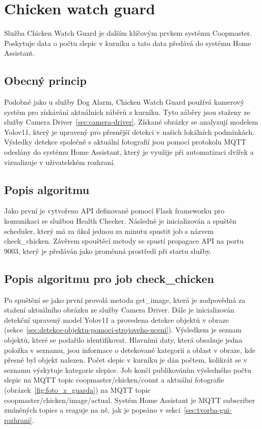 \section{Chicken watch guard}\label{sec:chicken-watch-guard}
Služba Chicken Watch Guard je dalším klíčovým prvkem systému Coopmaster.
Poskytuje data o počtu slepic v kurníku a tato data předává do systému Home Assistant.\newline

\subsection*{Obecný princip}
Podobně jako u služby Dog Alarm, Chicken Watch Guard používá kamerový systém pro získávání aktuálních záběrů z kurníku.
Tyto záběry jsou staženy ze služby Camera Driver~\ref{sec:camera-driver}.
Získané obrázky se analyzují modelem Yolov11, který je upravený pro přesnější detekci v našich lokálních podmínkách.
Výsledky detekce společně s aktuální fotografií jsou pomocí protokolu MQTT odeslány do systému Home Assistant, který je využije při automatizaci dvířek a vizualizuje v uživatelském rozhraní.

\subsection*{Popis algoritmu}
Jako první je vytvořeno API definované pomocí Flask frameworku pro komunikaci se službou Health Checker.
Následně je inicializován a spuštěn scheduler, který má za úkol jednou za minutu spustit job s názvem check\_chicken.
Závěrem spouštěcí metody se spustí propagace API na portu 9003, který je předáván jako proměnná prostředí při startu služby.

\subsection*{Popis algoritmu pro job check\_chicken}
Po spuštění se jako první provolá metoda get\_image, která je zodpovědná za stažení aktuálního obrázku ze služby Camera Driver.
Dále je inicializován detekční upravený model Yolov11 a provedena detekce objektů v obraze (sekce~\ref{sec:detekce-objektu-pomoci-strojoveho-uceni}).
Výsledkem je seznam objektů, které se podařilo identifikovat.
Hlavními daty, která obsahuje jedna položka v seznamu, jsou informace o detekované kategorii a oblast v obraze, kde přesně byl objekt nalezen.
Počet slepic v kurníku je dán počtem, kolikrát se v seznamu výskytuje kategorie slepice.
Job končí publikováním výsledného počtu slepic na MQTT topic coopmaster/chicken/count
 a aktuální fotografie (obrázek~\ref{fig:foto_z_guarda}) na MQTT topic coopmaster/chicken/image/actual.
Systém Home Assistant je MQTT subscriber zmíněných topics a reaguje na ně, jak je popsáno v sekci~\ref{sec:tvorba-gui-rozhrani}.

